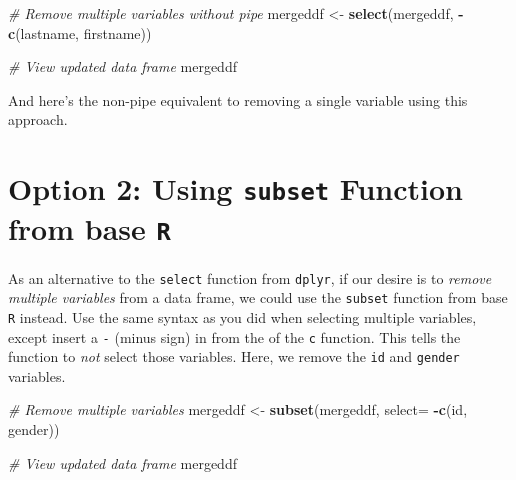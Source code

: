 \documentclass[]{book}
\newenvironment{Shaded}{\begin{snugshade}}{\end{snugshade}}
\newcommand{\KeywordTok}[1]{\textcolor[rgb]{0.13,0.29,0.53}{\textbf{#1}}}
\newcommand{\DataTypeTok}[1]{\textcolor[rgb]{0.13,0.29,0.53}{#1}}
\newcommand{\StringTok}[1]{\textcolor[rgb]{0.31,0.60,0.02}{#1}}
\newcommand{\CommentTok}[1]{\textcolor[rgb]{0.56,0.35,0.01}{\textit{#1}}}
\newcommand{\OperatorTok}[1]{\textcolor[rgb]{0.81,0.36,0.00}{\textbf{#1}}}
\newcommand{\NormalTok}[1]{#1}
\begin{document}
\begin{Shaded}
\begin{Highlighting}[]
\CommentTok{# Remove multiple variables without pipe}
\NormalTok{mergeddf <-}\StringTok{ }\KeywordTok{select}\NormalTok{(mergeddf, }\OperatorTok{-}\KeywordTok{c}\NormalTok{(lastname, firstname))}

\CommentTok{# View updated data frame}
\NormalTok{mergeddf}
\end{Highlighting}
\end{Shaded}

And here's the non-pipe equivalent to removing a single variable using
this approach.

\begin{Shaded}
\end{Shaded}

\section{\texorpdfstring{Option 2: Using \texttt{subset} Function from
base
\texttt{R}}{Option 2: Using subset Function from base R}}\label{option-2-using-subset-function-from-base-r-2}

As an alternative to the \texttt{select} function from \texttt{dplyr},
if our desire is to \emph{remove multiple variables} from a data frame,
we could use the \texttt{subset} function from base \texttt{R} instead.
Use the same syntax as you did when selecting multiple variables, except
insert a \texttt{-} (minus sign) in from the of the \texttt{c} function.
This tells the function to \emph{not} select those variables. Here, we
remove the \texttt{id} and \texttt{gender} variables.

\begin{Shaded}
\begin{Highlighting}[]
\CommentTok{# Remove multiple variables}
\NormalTok{mergeddf <-}\StringTok{ }\KeywordTok{subset}\NormalTok{(mergeddf, }\DataTypeTok{select=} \OperatorTok{-}\KeywordTok{c}\NormalTok{(id, gender))}

\CommentTok{# View updated data frame}
\NormalTok{mergeddf}
\end{Highlighting}
\end{Shaded}
\end{document}
